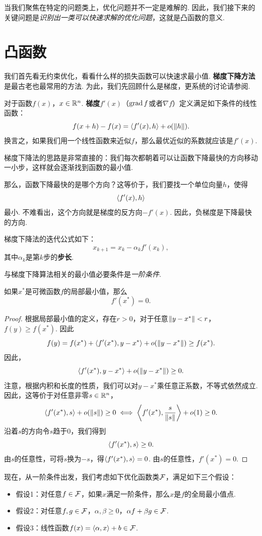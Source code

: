 当我们聚焦在特定的问题类上，优化问题并不一定是难解的. 因此，我们接下来的关键问题是\textit{识别出一类可以快速求解的优化问题}，这就是凸函数的意义. 


\section{凸函数}\label{sec:convex-function}

我们首先看无约束优化，看看什么样的损失函数可以快速求最小值. \textbf{梯度下降方法}是最古老也最常用的方法. 为此，我们先回顾什么是梯度，更系统的讨论请参阅.

对于函数$f(x)$，$x\in\mathbb{R}^n$. \textbf{梯度}$f'(x)$（$\operatorname*{grad} f$或者$\nabla f$）定义满足如下条件的线性函数：
    \[f(x+h)-f(x)=\left\langle{f'(x)},{h}\right\rangle+o(\left\|h\right\|).\]
换言之，如果我们用一个线性函数来近似$f$，那么最优近似的系数就应该是$f'(x)$.

梯度下降法的思路是非常直接的：我们每次都朝着可以让函数下降最快的方向移动一小步，这样就会逐渐找到函数的最小值. 

那么，函数下降最快的是哪个方向？这等价于，我们要找一个单位向量$h$，使得
\[\left\langle{f'(x)},{h}\right\rangle\]
最小. 不难看出，这个方向就是梯度的反方向$-f'(x)$. 因此，负梯度是下降最快的方向. 

梯度下降法的迭代公式如下：
\[x_{k+1}=x_k-\alpha_k f'(x_k),\]
其中$\alpha_k$是第$k$步的\textbf{步长}. 

与梯度下降算法相关的最小值必要条件是\textit{一阶条件}. 

\begin{theorem}[一阶条件]\label{theorem:first-order-condition}
    如果$x^*$是可微函数$f$的局部最小值，那么
    \[f'(x^*)=0.\]
\end{theorem}

\begin{proof}
根据局部最小值的定义，存在$r>0$，对于任意$\left\|y-x^*\right\|<r$，$f(y)\geq f(x^*)$. 因此
\[f(y)=f(x^*)+\left\langle{f'(x^*)},{y-x^*}\right\rangle+o(\left\|y-x^*\right\|)\geq f(x^*).\]
因此，
\[\left\langle{f'(x^*)},{y-x^*}\right\rangle+o(\left\|y-x^*\right\|)\geq 0.\]
注意，根据内积和长度的性质，我们可以对$y-x^*$乘任意正系数，不等式依然成立. 因此，这等价于对任意非零$s\in\mathbb{R}^n$，
\[\left\langle{f'(x^*)},{s}\right\rangle+o(\left\|s\right\|)\geq 0\iff \left\langle{f'(x^*)},{\frac{s}{\left\|s\right\|}}\right\rangle+o(1)\geq 0.\]
沿着$s$的方向令$s$趋于$0$，我们得到
\[\left\langle{f'(x^*)},{s}\right\rangle\geq 0.\]
由$s$的任意性，可将$s$换为$-s$，得$\left\langle{f'(x^*)},{s}\right\rangle=0$. 由$s$的任意性，$f'(x^*)=0$.
\end{proof}

现在，从一阶条件出发，我们考虑如下优化函数类$\mathcal F$，满足如下三个假设：
\begin{itemize}
    \item 假设1：对任意$f\in\mathcal F$，如果$x$满足一阶条件，那么$x$是$f$的全局最小值点.
    \item 假设2：对任意$f,g\in\mathcal F$，$\alpha,\beta\geq 0$，$\alpha f+\beta g\in\mathcal F$.
    \item 假设3：线性函数$f(x)=\left\langle{\alpha},{x}\right\rangle+b\in\mathcal F$.
\end{itemize}

